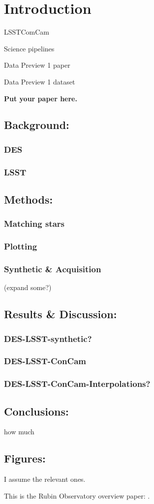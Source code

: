 \section{Introduction}

LSSTComCam \citep{10.71929/rubin/2561361}

Science pipelines \citep{PSTN-019}

Data Preview 1 paper \citep{RTN-095}

Data Preview 1 dataset \citep{10.71929/rubin/2570308}

\textbf{Put your paper here.}

\subsection{Background:}
\subsubsection{DES}
\subsubsection{LSST}

\subsection{Methods:}
\subsubsection{Matching stars}
\subsubsection{Plotting}
\subsubsection{Synthetic \& Acquisition}
(expand some?)


\subsection{Results \& Discussion:}
\subsubsection{DES-LSST-synthetic?}
\subsubsection{DES-LSST-ConCam}
\subsubsection{DES-LSST-ConCam-Interpolations?}

\subsection{Conclusions:} how much

\subsection{Figures:} I assume the relevant ones.


\vskip 0.4in



This is the Rubin Observatory overview paper: \citet{2019ApJ...873..111I}.
